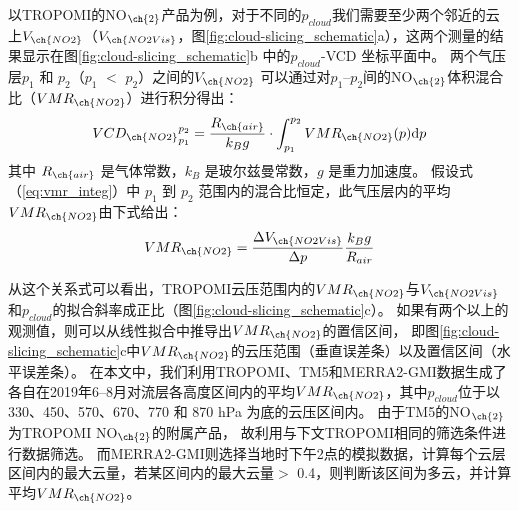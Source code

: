 以TROPOMI的NO$_{\ch{2}}$产品为例，对于不同的$p_{cloud}$我们需要至少两个邻近的云上$V_{\ch{NO2}}$（$V_{\ch{NO2Vis}}$，图\ref{fig:cloud-slicing_schematic}a），这两个测量的结果显示在图\ref{fig:cloud-slicing_schematic}b 中的$p_{cloud}$-VCD 坐标平面中。
两个气压层$p_1$ 和 $p_2$（$p_1$ $<$ $p_2$）之间的$V_{\ch{NO2}}$
可以通过对$p_1$--$p_2$间的NO$_{\ch{2}}$体积混合比（$VMR_{\ch{NO2}}$）进行积分得出：
\begin{equation} \label{eq:vmr_integ}
{VCD_{\ch{NO2}}}_{p_1}^{p_2}=\frac{R_{\ch{air}}}{k_Bg} \cdot \int_{p_1}^{p_2} VMR_{\ch{NO2}}(p) \mathrm{d} p
\end{equation}
其中 $R_{\ch{air}}$ 是气体常数，$k_B$ 是玻尔兹曼常数，$g$ 是重力加速度。
假设式（\ref{eq:vmr_integ}）中 $p_1$ 到 $p_2$ 范围内的混合比恒定，此气压层内的平均$VMR_{\ch{NO2}}$由下式给出：
\begin{equation}
VMR_{\ch{NO2}} = \frac{\Delta V_{\ch{NO2Vis}}}{\Delta p} \frac{k_B g}{R_{air}}
\end{equation}

从这个关系式可以看出，TROPOMI云压范围内的$VMR_{\ch{NO2}}$与$V_{\ch{NO2Vis}}$和$p_{cloud}$的拟合斜率成正比（图\ref{fig:cloud-slicing_schematic}c）。
如果有两个以上的观测值，则可以从线性拟合中推导出$VMR_{\ch{NO2}}$的置信区间，
即图\ref{fig:cloud-slicing_schematic}c中$VMR_{\ch{NO2}}$的云压范围（垂直误差条）以及置信区间（水平误差条）。
在本文中，我们利用TROPOMI、TM5和MERRA2-GMI数据生成了各自在2019年6--8月对流层各高度区间内的平均$VMR_{\ch{NO2}}$，其中$p_{cloud}$位于以 330、450、570、670、770 和 870 hPa 为底的云压区间内。
由于TM5的NO$_{\ch{2}}$为TROPOMI NO$_{\ch{2}}$的附属产品，
故利用与下文TROPOMI相同的筛选条件进行数据筛选。
而MERRA2-GMI则选择当地时下午2点的模拟数据，计算每个云层区间内的最大云量，若某区间内的最大云量$>$ 0.4，则判断该区间为多云，并计算平均$VMR_{\ch{NO2}}$。


